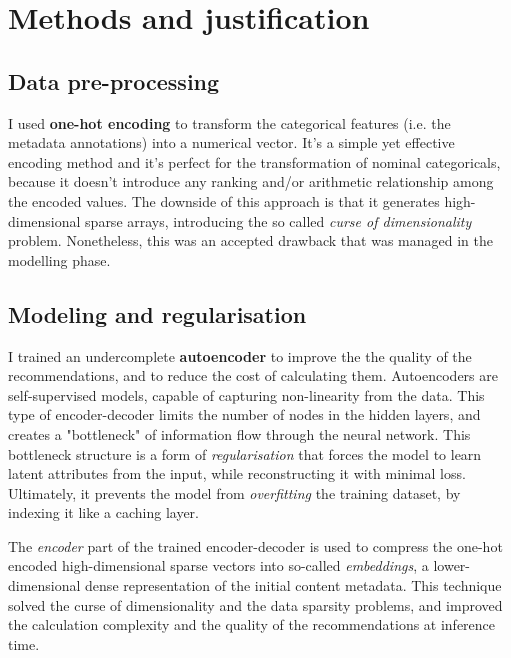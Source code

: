 
\section{Methods and justification}

\subsection{Data pre-processing}

I used \textbf{one-hot encoding} to transform the categorical features (i.e. the metadata annotations) into a numerical vector.
It's a simple yet effective encoding method and it's perfect for the transformation of nominal categoricals,
because it doesn't introduce any ranking and/or arithmetic relationship among the
encoded values. The downside of this approach is that it generates high-dimensional sparse arrays,
introducing the so called \textit{curse of dimensionality} problem. Nonetheless, this was an accepted drawback that was
managed in the modelling phase.

\subsection{Modeling and regularisation}

I trained an undercomplete \textbf{autoencoder} to improve the the quality of the recommendations, and to reduce the cost of calculating them.
Autoencoders are self-supervised models, capable of capturing non-linearity from the data. This type of encoder-decoder limits
the number of nodes in the hidden layers, and creates a "bottleneck" of information flow through the neural network.
This bottleneck structure is a form of \textit{regularisation} that forces the model to learn latent attributes from the input,
while reconstructing it with minimal loss. Ultimately, it prevents the model from \textit{overfitting} the training dataset,
by indexing it like a caching layer.

The \textit{encoder} part of the trained encoder-decoder is used to compress the one-hot encoded high-dimensional sparse vectors into
so-called \textit{embeddings}, a lower-dimensional dense representation of the initial content metadata.
This technique solved the curse of dimensionality and the data sparsity problems, and improved the calculation complexity and the quality
of the recommendations at inference time.


